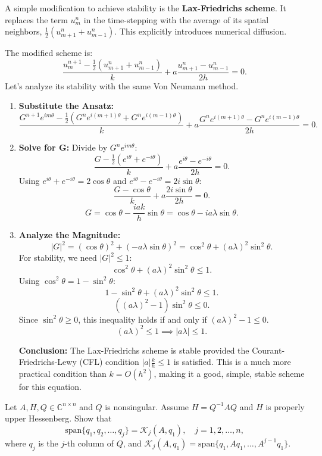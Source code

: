 \begin{solution}
A simple modification to achieve stability is the \textbf{Lax-Friedrichs scheme}. It replaces the term $u_m^n$ in the time-stepping with the average of its spatial neighbors, $\frac{1}{2}(u_{m+1}^n + u_{m-1}^n)$. This explicitly introduces numerical diffusion.

The modified scheme is:
\[ \frac{u_m^{n+1} - \frac{1}{2}(u_{m+1}^n + u_{m-1}^n)}{k} + a\frac{u_{m+1}^n - u_{m-1}^n}{2h} = 0. \]
Let's analyze its stability with the same Von Neumann method.
\begin{enumerate}
    \item \textbf{Substitute the Ansatz:}
    \[ \frac{G^{n+1}e^{im\theta} - \frac{1}{2}(G^n e^{i(m+1)\theta} + G^n e^{i(m-1)\theta})}{k} + a\frac{G^n e^{i(m+1)\theta} - G^n e^{i(m-1)\theta}}{2h} = 0. \]
    
    \item \textbf{Solve for G:} Divide by $G^n e^{im\theta}$:
    \[ \frac{G - \frac{1}{2}(e^{i\theta} + e^{-i\theta})}{k} + a\frac{e^{i\theta} - e^{-i\theta}}{2h} = 0. \]
    Using $e^{i\theta} + e^{-i\theta} = 2\cos\theta$ and $e^{i\theta} - e^{-i\theta} = 2i\sin\theta$:
    \[ \frac{G - \cos\theta}{k} + a\frac{2i\sin\theta}{2h} = 0. \]
    \[ G = \cos\theta - \frac{iak}{h}\sin\theta = \cos\theta - ia\lambda\sin\theta. \]
    
    \item \textbf{Analyze the Magnitude:}
    \[ |G|^2 = (\cos\theta)^2 + (-a\lambda\sin\theta)^2 = \cos^2\theta + (a\lambda)^2\sin^2\theta. \]
    For stability, we need $|G|^2 \le 1$:
    \[ \cos^2\theta + (a\lambda)^2\sin^2\theta \le 1. \]
    Using $\cos^2\theta = 1 - \sin^2\theta$:
    \[ 1 - \sin^2\theta + (a\lambda)^2\sin^2\theta \le 1. \]
    \[ ((a\lambda)^2 - 1)\sin^2\theta \le 0. \]
    Since $\sin^2\theta \ge 0$, this inequality holds if and only if $(a\lambda)^2 - 1 \le 0$.
    \[ (a\lambda)^2 \le 1 \implies |a\lambda| \le 1. \]
    
    \textbf{Conclusion:} The Lax-Friedrichs scheme is stable provided the Courant-Friedrichs-Lewy (CFL) condition $|a| \frac{k}{h} \le 1$ is satisfied. This is a much more practical condition than $k=O(h^2)$, making it a good, simple, stable scheme for this equation.
\end{enumerate}
\end{solution}

\begin{exercise}
\label{applied:2015:4}
Let $A,H,Q\in\mathbb{C}^{n\times n}$ and $Q$ is nonsingular. Assume $H=Q^{-1}AQ$ and $H$ is properly upper Hessenberg. Show that
\[
\mathrm{span}\{q_{1},q_{2},\dots,q_{j}\}=\mathcal{K}_{j}(A,q_{1}),\quad j=1,2,\dots,n,
\]
where $q_{j}$ is the $j$-th column of $Q$, and $\mathcal{K}_{j}(A,q_{1})=\mathrm{span}\{q_{1},Aq_{1},\dots,A^{j-1}q_{1}\}$.
\end{exercise}


